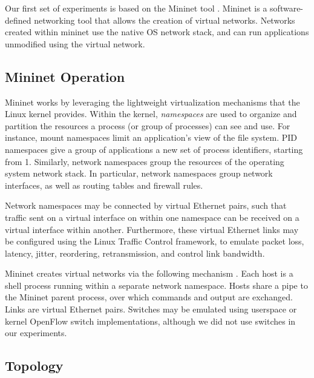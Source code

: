 \documentclass{cwru}
\begin{document}
Our first set of experiments is based on the Mininet tool \cite{mininet}.
Mininet is a software-defined networking tool that allows the creation of
virtual networks. Networks created within mininet use the native OS network
stack, and can run applications unmodified using the virtual network.

\subsection{Mininet Operation}

Mininet works by leveraging the lightweight virtualization mechanisms that the
Linux kernel provides. Within the kernel, \emph{namespaces} are used to organize
and partition the resources a process (or group of processes) can see and use.
For instance, mount namespaces limit an application's view of the file system.
PID namespaces give a group of applications a new set of process identifiers,
starting from 1. Similarly, network namespaces group the resources of the
operating system network stack. In particular, network namespaces group network
interfaces, as well as routing tables and firewall rules.

Network namespaces may be connected by virtual Ethernet pairs, such that traffic
sent on a virtual interface on within one namespace can be received on a virtual
interface within another. Furthermore, these virtual Ethernet links may be
configured using the Linux Traffic Control framework, to emulate packet loss,
latency, jitter, reordering, retransmission, and control link bandwidth.

Mininet creates virtual networks via the following mechanism
\cite{lantz2010network}. Each host is a shell process running within a separate
network namespace. Hosts share a pipe to the Mininet parent process, over which
commands and output are exchanged. Links are virtual Ethernet pairs. Switches
may be emulated using userspace or kernel OpenFlow switch implementations,
although we did not use switches in our experiments.

\subsection{Topology}
\end{document}
